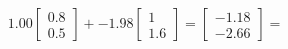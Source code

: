 \documentclass[preview]{standalone}
\begin{document}
\begin{align*}
1.00 \begin{bmatrix} 0.8 \\ 0.5 \end{bmatrix} + -1.98 \begin{bmatrix} 1 \\ 1.6 \end{bmatrix} = \begin{bmatrix} -1.18 \\ -2.66 \end{bmatrix} =
\end{align*}
\end{document}
